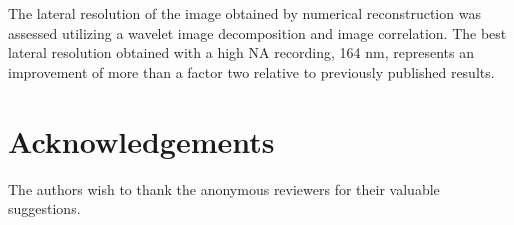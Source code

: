 \documentclass[]{IEEEphot}
\begin{document}
The lateral resolution of the image obtained by numerical reconstruction was assessed utilizing a wavelet image decomposition and image correlation. The best lateral resolution obtained with a high NA recording, 164 nm, represents an improvement of more than a factor two relative to previously published results.     

\section*{Acknowledgements}
The authors wish to thank the anonymous reviewers for their valuable suggestions.  






\end{document}
